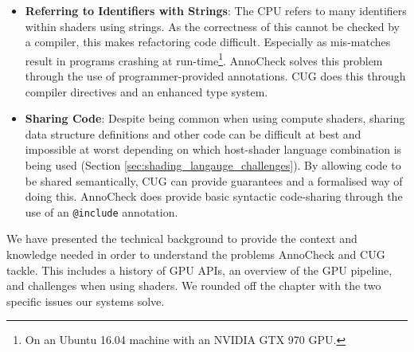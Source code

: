 \documentclass[a4paper,12pt,twoside,openright]{report}
\begin{document}
\begin{itemize}

    \item \textbf{Referring to Identifiers with Strings}: The CPU refers to
    many identifiers within shaders using strings. As the correctness of this
    cannot be checked by a compiler, this makes refactoring code difficult.
    Especially as mis-matches result in programs crashing at
    run-time\footnote{On an Ubuntu 16.04 machine with an NVIDIA GTX 970 GPU.}.
    AnnoCheck solves this problem through the use of programmer-provided
    annotations. CUG does this through compiler directives and an enhanced type
    system.

    \item \textbf{Sharing Code}: Despite being common when using compute
    shaders, sharing data structure definitions and other code can be difficult
    at best and impossible at worst depending on which host-shader language
    combination is being used (Section \ref{sec:shading_langauge_challenges}).
    By allowing code to be shared semantically, CUG can provide guarantees and
    a formalised way of doing this. AnnoCheck does provide basic syntactic
    code-sharing through the use of an \texttt{@include} annotation.

\end{itemize}



We have presented the technical background to provide the context and knowledge
needed in order to understand the problems AnnoCheck and CUG tackle. This
includes a history of GPU APIs, an overview of the GPU pipeline, and challenges
when using shaders. We rounded off the chapter with the two specific issues our
systems solve.



\end{document}
